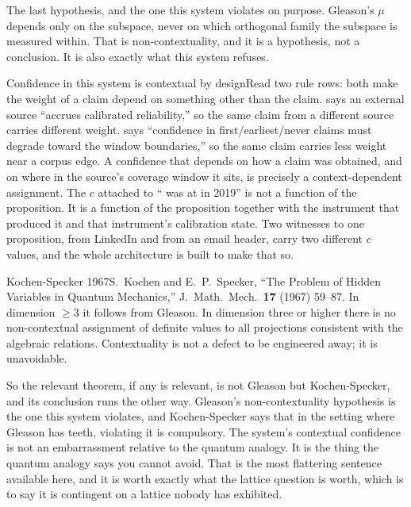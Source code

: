 The last hypothesis, and the one this system violates on purpose. Gleason's $\mu$ depends only on the subspace, never on which orthogonal family the subspace is measured within. That is non-contextuality, and it is a hypothesis, not a conclusion. It is also exactly what this system refuses.

\begin{Correspondence}{Confidence in this system is contextual by design}{Read two rule rows: both make the weight of a claim depend on something other than the claim.}
 says an external source ``accrues calibrated reliability,'' so the same claim from a different source carries different weight.  says ``confidence in first/earliest/never claims must degrade toward the window boundaries,'' so the same claim carries less weight near a corpus edge.
A confidence that depends on how a claim was obtained, and on where in the source's coverage window it sits, is precisely a context-dependent assignment. The $c$ attached to ``\labPerson{} was at \labVenue{} in 2019'' is not a function of the proposition. It is a function of the proposition together with the instrument that produced it and that instrument's calibration state. Two witnesses to one proposition, from LinkedIn and from an email header, carry two different $c$ values, and the whole architecture is built to make that so.
\end{Correspondence}

\begin{Theorem}{Kochen-Specker 1967}{S.\ Kochen and E.\ P.\ Specker, ``The Problem of Hidden Variables in Quantum Mechanics,'' J.\ Math.\ Mech.\ \textbf{17} (1967) 59--87. In dimension $\geq 3$ it follows from Gleason.}
In dimension three or higher there is no non-contextual assignment of definite values to all projections consistent with the algebraic relations. Contextuality is not a defect to be engineered away; it is unavoidable.
\end{Theorem}

So the relevant theorem, if any is relevant, is not Gleason but Kochen-Specker, and its conclusion runs the other way. Gleason's non-contextuality hypothesis is the one this system violates, and Kochen-Specker says that in the setting where Gleason has teeth, violating it is compulsory. The system's contextual confidence is not an embarrassment relative to the quantum analogy. It is the thing the quantum analogy says you cannot avoid. That is the most flattering sentence available here, and it is worth exactly what the lattice question is worth, which is to say it is contingent on a lattice nobody has exhibited.

